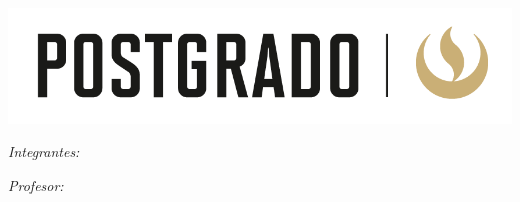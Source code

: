 

\begin{titlepage}

\setlength{\parskip}{0pt}

\begin{center}
\includegraphics[width=1\textwidth]{Figures/upc_p}

    \vspace{0.6cm}
    {\zhawtitlefont\color{zhawblue}\LARGE \univname\par}   %
    \vspace{0.2cm}
{\Large  \deptname\par}                      %
\vspace{0.2cm}
\vspace{3.5cm}                            
\textsc{\Large \ttype}                                 %
\vspace{0.2cm}
\HRule 
\vspace{0.4cm}
{\huge \bfseries \ttitle\par}                          %
\vspace{0.4cm}  
\HRule
\vspace{1.5cm}

 
\begin{minipage}[t]{0.4\textwidth}
\begin{flushleft} 
    \large
    \emph{Integrantes:}\\
    \authorname
\end{flushleft}
\end{minipage}
\begin{minipage}[t]{0.4\textwidth}
\begin{flushright} 
    \large
    \emph{Profesor:} \\
    \supnameA \\
    \supnameB
\end{flushright}
\end{minipage}
\vspace{2cm}
 

\end{center}
\end{titlepage}

